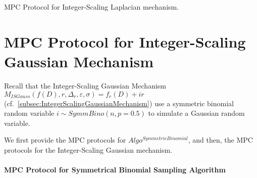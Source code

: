       \begin{protocol}[tbh!]
            \centering
            \caption{MPC Protocol for Integer-Scaling Laplacian mechanism.}
            \label{prot:ISLap}
      \end{protocol}
      \FloatBarrier




      \section{MPC Protocol for Integer-Scaling Gaussian Mechanism}
      \label{sec:MPCProtocolforInteger-ScalingGaussianMechanism}
      Recall that the Integer-Scaling Gaussian Mechanism $M_{ISGauss}\left(f\left(D\right),r,\Delta_r,\varepsilon,\sigma\right)=f_r\left(D\right) +ir$ (cf.~\autoref{subsec:IntegerScalingGaussianMechanism}) use a symmetric binomial random variable $i\sim SymmBino\left(n,p=0.5\right)$ to simulate a Gaussian random variable.

      We first provide the MPC protocols for $Algo^{SymmetricBinomial}$, and then, the MPC protocols for the Integer-Scaling Gaussian mechanism.

      \paragraph{MPC Protocol for Symmetrical Binomial Sampling Algorithm}
      \label{para:MPCProtocolforSymmetricalBinomialSamplingAlgorithm}

